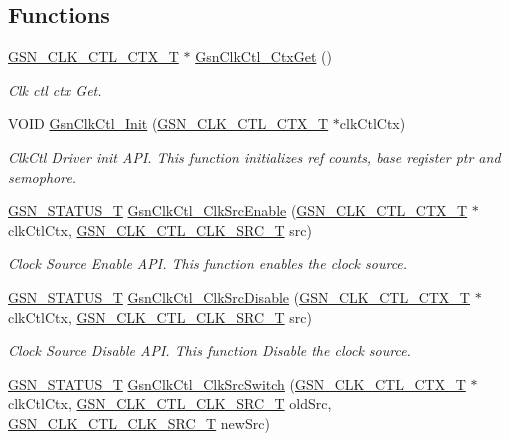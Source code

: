 \subsection*{Functions}
\begin{DoxyCompactItemize}
\item 
\hyperlink{a00039}{GSN\_\-CLK\_\-CTL\_\-CTX\_\-T} $\ast$ \hyperlink{a00644_gaef13c343baa0a6f395810efe229e7e31}{GsnClkCtl\_\-CtxGet} ()
\begin{DoxyCompactList}\small\item\em Clk ctl ctx Get. \end{DoxyCompactList}\item 
VOID \hyperlink{a00644_ga74a76a16a91b861c57de64bf57b48791}{GsnClkCtl\_\-Init} (\hyperlink{a00039}{GSN\_\-CLK\_\-CTL\_\-CTX\_\-T} $\ast$clkCtlCtx)
\begin{DoxyCompactList}\small\item\em ClkCtl Driver init API. This function initializes ref counts, base register ptr and semophore. \end{DoxyCompactList}\item 
\hyperlink{a00659_gae36517c0f5872426a7034c9551eb96ac}{GSN\_\-STATUS\_\-T} \hyperlink{a00644_ga38236e68d421597db2a20b7de39d16cf}{GsnClkCtl\_\-ClkSrcEnable} (\hyperlink{a00039}{GSN\_\-CLK\_\-CTL\_\-CTX\_\-T} $\ast$clkCtlCtx, \hyperlink{a00644_ga95d23078ba56d33653b82794ca56f5d6}{GSN\_\-CLK\_\-CTL\_\-CLK\_\-SRC\_\-T} src)
\begin{DoxyCompactList}\small\item\em Clock Source Enable API. This function enables the clock source. \end{DoxyCompactList}\item 
\hyperlink{a00659_gae36517c0f5872426a7034c9551eb96ac}{GSN\_\-STATUS\_\-T} \hyperlink{a00644_gaa111736e7f1f7c8c3715827b8fa1ee28}{GsnClkCtl\_\-ClkSrcDisable} (\hyperlink{a00039}{GSN\_\-CLK\_\-CTL\_\-CTX\_\-T} $\ast$clkCtlCtx, \hyperlink{a00644_ga95d23078ba56d33653b82794ca56f5d6}{GSN\_\-CLK\_\-CTL\_\-CLK\_\-SRC\_\-T} src)
\begin{DoxyCompactList}\small\item\em Clock Source Disable API. This function Disable the clock source. \end{DoxyCompactList}\item 
\hyperlink{a00659_gae36517c0f5872426a7034c9551eb96ac}{GSN\_\-STATUS\_\-T} \hyperlink{a00644_gacacf5da645112b8bc401a79b031eda53}{GsnClkCtl\_\-ClkSrcSwitch} (\hyperlink{a00039}{GSN\_\-CLK\_\-CTL\_\-CTX\_\-T} $\ast$clkCtlCtx, \hyperlink{a00644_ga95d23078ba56d33653b82794ca56f5d6}{GSN\_\-CLK\_\-CTL\_\-CLK\_\-SRC\_\-T} oldSrc, \hyperlink{a00644_ga95d23078ba56d33653b82794ca56f5d6}{GSN\_\-CLK\_\-CTL\_\-CLK\_\-SRC\_\-T} newSrc)

\end{DoxyCompactItemize}
